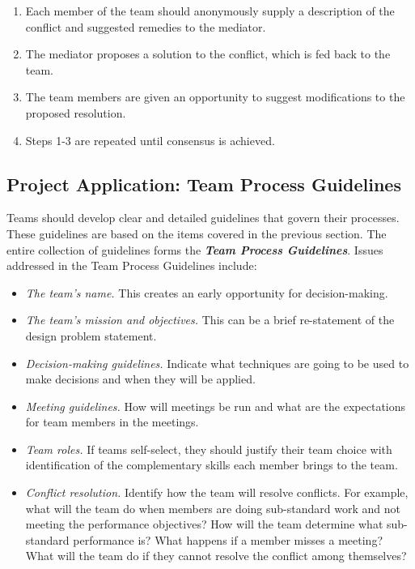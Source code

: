 \begin{enumerate}
\def\labelenumi{\arabic{enumi}.}
\item
  Each member of the team should anonymously supply a description of the
  conflict and suggested remedies to the mediator.
\item
  The mediator proposes a solution to the conflict, which is fed back to
  the team.
\item
  The team members are given an opportunity to suggest modifications to
  the proposed resolution.
\item
  Steps 1-3 are repeated until consensus is achieved.
\end{enumerate}

\subsection{Project Application: Team Process
Guidelines}\label{project-application-team-process-guidelines}

Teams should develop clear and detailed guidelines that govern their
processes. These guidelines are based on the items covered in the
previous section. The entire collection of guidelines forms the
\emph{\textbf{Team Process Guidelines}}. Issues addressed in the Team
Process Guidelines include:

\begin{itemize}
\item
  \emph{The team's name.} This creates an early opportunity for
  decision-making.
\item
  \emph{The team's mission and objectives.} This can be a brief
  re-statement of the design problem statement.
\item
  \emph{Decision-making guidelines.} Indicate what techniques are going
  to be used to make decisions and when they will be applied.
\item
  \emph{Meeting guidelines.} How will meetings be run and what are the
  expectations for team members in the meetings.
\item
  \emph{Team roles.} If teams self-select, they should justify their
  team choice with identification of the complementary skills each
  member brings to the team.
\item
  \emph{Conflict resolution.} Identify how the team will resolve
  conflicts. For example, what will the team do when members are doing
  sub-standard work and not meeting the performance objectives? How will
  the team determine what sub-standard performance is? What happens if a
  member misses a meeting? What will the team do if they cannot resolve
  the conflict among themselves?
\end{itemize}

